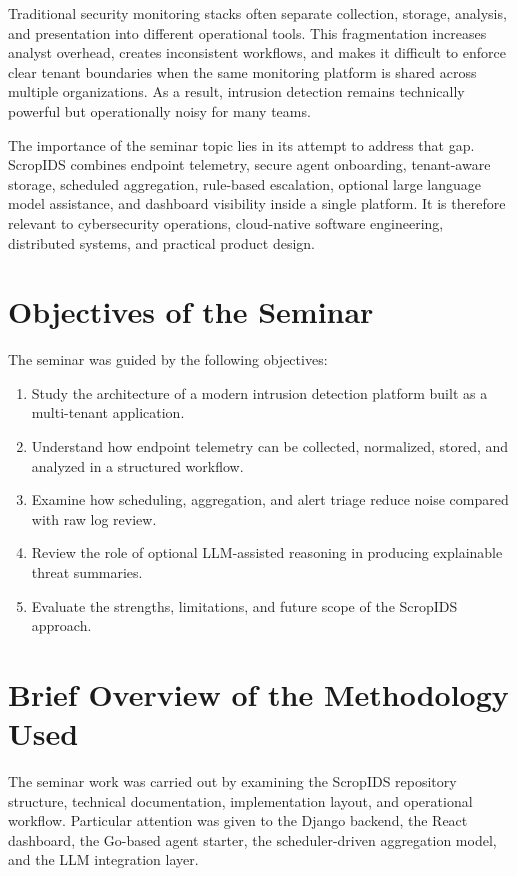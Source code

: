 \documentclass[12pt,a4paper]{report}
\begin{document}
Traditional security monitoring stacks often separate collection, storage, analysis, and presentation into different operational tools. This fragmentation increases analyst overhead, creates inconsistent workflows, and makes it difficult to enforce clear tenant boundaries when the same monitoring platform is shared across multiple organizations. As a result, intrusion detection remains technically powerful but operationally noisy for many teams.

The importance of the seminar topic lies in its attempt to address that gap. ScropIDS combines endpoint telemetry, secure agent onboarding, tenant-aware storage, scheduled aggregation, rule-based escalation, optional large language model assistance, and dashboard visibility inside a single platform. It is therefore relevant to cybersecurity operations, cloud-native software engineering, distributed systems, and practical product design.

\section{Objectives of the Seminar}
The seminar was guided by the following objectives:
\begin{enumerate}
    \item Study the architecture of a modern intrusion detection platform built as a multi-tenant application.
    \item Understand how endpoint telemetry can be collected, normalized, stored, and analyzed in a structured workflow.
    \item Examine how scheduling, aggregation, and alert triage reduce noise compared with raw log review.
    \item Review the role of optional LLM-assisted reasoning in producing explainable threat summaries.
    \item Evaluate the strengths, limitations, and future scope of the ScropIDS approach.
\end{enumerate}

\section{Brief Overview of the Methodology Used}
The seminar work was carried out by examining the ScropIDS repository structure, technical documentation, implementation layout, and operational workflow. Particular attention was given to the Django backend, the React dashboard, the Go-based agent starter, the scheduler-driven aggregation model, and the LLM integration layer.
\end{document}
